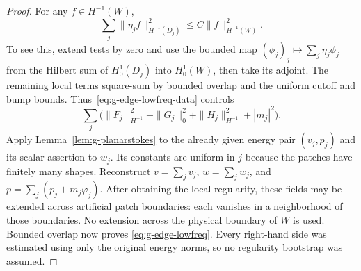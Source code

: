 \documentclass[11pt,a4paper]{article}
\theoremstyle{remark}
\numberwithin{equation}{section}
\begin{document}
\begin{proof}
For any $f\in H^{-1}(W)$,
\begin{equation}\label{eq:g-edge-patch-duality}
 \sum_j\|\eta_j f\|_{H^{-1}(D_j)}^2
 \le C\|f\|_{H^{-1}(W)}^2.
\end{equation}
To see this, extend tests by zero and use the bounded map
$(\phi_j)_j\mapsto\sum_j\eta_j\phi_j$ from the Hilbert sum of
$H^1_0(D_j)$ into $H^1_0(W)$, then take its adjoint. The remaining local
terms square-sum by bounded overlap and the uniform cutoff and bump bounds.
Thus~\eqref{eq:g-edge-lowfreq-data} controls
\[
 \sum_j\bigl(\|F_j\|_{H^{-1}}^2+\|G_j\|_0^2+
                 \|H_j\|_{H^{-1}}^2+|m_j|^2\bigr).
\]
Apply Lemma~\ref{lem:g-planarstokes} to the already given energy pair
$(v_j,p_j)$ and its scalar assertion to $w_j$. Its constants are uniform
in $j$ because the patches have finitely many shapes. Reconstruct
$v=\sum_jv_j$, $w=\sum_jw_j$, and
$p=\sum_j(p_j+m_j\varphi_j)$. After obtaining the local regularity, these
fields may be extended across artificial patch boundaries: each vanishes
in a neighborhood of those boundaries. No extension across the physical
boundary of $W$ is used. Bounded overlap now proves
\eqref{eq:g-edge-lowfreq}. Every right-hand side was estimated using only
the original energy norms, so no regularity bootstrap was assumed.
\end{proof}
\end{document}
